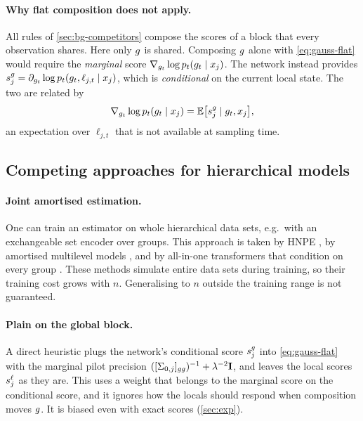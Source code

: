 \paragraph{Why flat composition does not apply.}
All rules of \cref{sec:bg-competitors} compose the scores of a block that every observation shares.
Here only $g$ is shared.
Composing $g$ alone with \cref{eq:gauss-flat} would require the \emph{marginal} score $\nabla_{g_t}\log p_t(g_t\mid x_j)$.
The network instead provides $s_j^{g}=\partial_{g_t}\log p_t(g_t,\ell_{j,t}\mid x_j)$, which is \emph{conditional} on the current local state.
The two are related by
\begin{equation}\label{eq:marginal-vs-conditional}
  \nabla_{g_t}\log p_t(g_t\mid x_j)=\mathbb{E}\big[s_j^{g}\mid g_t,x_j\big],
\end{equation}
an expectation over $\ell_{j,t}$ that is not available at sampling time.

\subsection{Competing approaches for hierarchical models}\label{sec:bg-hier-competitors}

\paragraph{Joint amortised estimation.}
One can train an estimator on whole hierarchical data sets, e.g.\ with an exchangeable set encoder over groups.
This approach is taken by HNPE \citep{rodrigues2021hnpe}, by amortised multilevel models \citep{habermann2024amortized}, and by all-in-one transformers that condition on every group \citep{gloeckler2024allinone}.
These methods simulate entire data sets during training, so their training cost grows with $n$.
Generalising to $n$ outside the training range is not guaranteed.

\paragraph{Plain \gauss{} on the global block.}
A direct heuristic plugs the network's conditional score $s_j^{g}$ into \cref{eq:gauss-flat} with the marginal pilot precision $([\Sigma_{0,j}]_{gg})^{-1}+\lambda^{-2}\mathbf{I}$, and leaves the local scores $s_j^{\ell}$ as they are.
This uses a weight that belongs to the marginal score on the conditional score, and it ignores how the locals should respond when composition moves $g$.
It is biased even with exact scores (\cref{sec:exp}).

